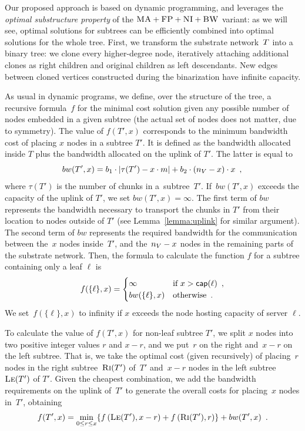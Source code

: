  Our proposed approach is based on dynamic programming, and
leverages the \emph{optimal substructure property} of the $\textsc{MA}+\textsc{FP}+\textsc{NI}+\textsc{BW}$ variant:
as we will see, optimal solutions for subtrees
can be efficiently combined into optimal solutions for the whole tree.
First, we transform the
substrate network~$T$
into a binary tree:
we clone every higher-degree node,
iteratively attaching additional clones as right children
and original children as left descendants.
New edges between cloned vertices constructed during the binarization have infinite capacity.

As usual in dynamic programs, we define, over the structure of the tree, a
recursive formula~$f$ for
the minimal cost solution given any possible number of nodes
embedded in a given subtree (the actual set of nodes does not matter,
due to symmetry).
The value of $f(T', x)$ corresponds to the minimum bandwidth cost of placing $x$ nodes in a subtree $T'$.
It is defined as the bandwidth allocated inside $T$ plus the bandwidth allocated on the uplink of $T'$.
The latter is equal to
\[
bw(T',x) = 
    b_1\cdot|\tau(T')-x\cdot m| +b_2 \cdot
(n_V - x) \cdot x\enspace, \\
  \]
  where $\tau(T')$ is the number of chunks in a~subtree~$T'$.
  If~$bw(T',x)$ exceeds the capacity of the uplink of $T'$, we set $bw(T', x) = \infty$.
  The first term of $bw$ represents
the bandwidth necessary to transport the chunks in $T'$ from their location to
nodes outside of $T'$ (see Lemma~\ref{lemma:uplink} for similar argument).
The second term of $bw$ represents the required bandwidth for the communication between the~$x$
nodes inside~$T'$, and the~$n_V - x$ nodes in the remaining parts of the substrate
network.
Then, the formula to calculate the function $f$ for a subtree containing only a leaf $\ell$ is
\[
f(\{ \ell \}, x) =
\begin{cases}
   \infty & \mbox{if } x > \textsf{cap}(\ell)\enspace,\\
    bw(\{ \ell \}, x) & \mbox{otherwise}\enspace. \\
  \end{cases}
  \]
We set~$f(\{ \ell \},x)$ to infinity if $x$ exceeds the node hosting capacity of server $\ell$.

To calculate the value of $f(T', x)$ for non-leaf subtree $T'$, we split $x$ nodes
into two positive integer
values $r$ and $x-r$, and we put~$r$ on the right and~$x - r$ on the left subtree.
That is, we take the optimal cost
(given recursively) of placing~$r$ nodes in
the right subtree~$\textsc{Ri}(T')$ of~$T'$ and~$x-r$ nodes in the left subtree~$\textsc{Le}(T')$ of
$T'$. Given the cheapest combination, we add the bandwidth requirements
on the uplink of~$T'$ to generate the overall costs for placing~$x$ nodes in~$T'$, obtaining
\[
  f(T', x) = 
    \min_{0\leq r \leq x} \{  f\left(\textsc{Le}(T'),
x-r\right) +
f\left(\textsc{Ri}(T'), r\right) \} + bw(T',x)\enspace.
  \]

